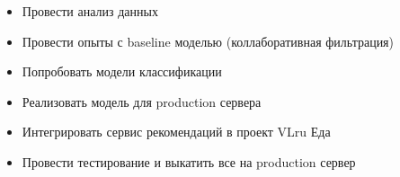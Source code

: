 \begin{itemize}
  \item Провести анализ данных
  \item Провести опыты с baseline моделью (коллаборативная фильтрация)
  \item Попробовать модели классификации
  \item Реализовать модель для production сервера
  \item Интегрировать сервис рекомендаций в проект VLru Еда
  \item Провести тестирование и выкатить все на production сервер
\end{itemize}
